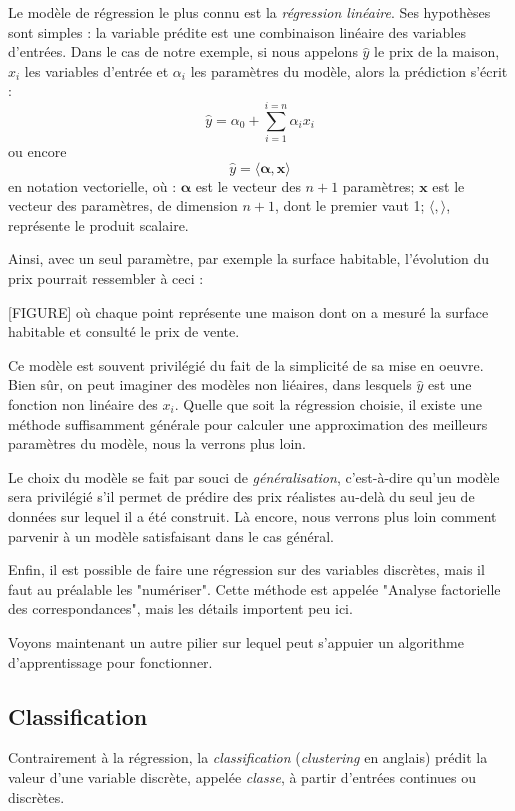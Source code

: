 Le modèle de régression le plus connu est la \emph{régression linéaire}. Ses hypothèses sont simples : la variable prédite est une combinaison linéaire des variables d'entrées. Dans le cas de notre exemple, si nous appelons \(\hat y\) le prix de la maison, \(x_i\) les variables d'entrée et \(\alpha_i\) les paramètres du modèle, alors la prédiction s'écrit :
\[\hat{y} = \alpha_0 + \sum_{i = 1}^{i = n}{\alpha_i x_i}\]
ou encore 
\begin{equation} \label{eq:reg_lin}
\hat{y} = \langle \boldsymbol{\alpha}, \boldsymbol{x} \rangle
\end{equation}
en notation vectorielle, où : \(\boldsymbol{\alpha}\) est le vecteur des \(n + 1\) paramètres; \(\boldsymbol{x}\) est le vecteur des paramètres, de dimension \(n + 1\), dont le premier vaut 1;  \(\langle, \rangle\), représente le produit scalaire.

Ainsi, avec un seul paramètre, par exemple la surface habitable, l'évolution du prix pourrait ressembler à ceci :

[FIGURE]
où chaque point représente une maison dont on a mesuré la surface habitable et consulté le prix de vente.

Ce modèle est souvent privilégié du fait de la simplicité de sa mise en oeuvre. Bien sûr, on peut imaginer des modèles non liéaires, dans lesquels \(\hat y\) est une fonction non linéaire des \(x_i\). Quelle que soit la régression choisie, il existe une méthode suffisamment générale pour calculer une approximation des meilleurs paramètres du modèle, nous la verrons plus loin.

Le choix du modèle se fait par souci de \emph{généralisation}, c'est-à-dire qu'un modèle sera privilégié s'il permet de prédire des prix réalistes au-delà du seul jeu de données sur lequel il a été construit. Là encore, nous verrons plus loin comment parvenir à un modèle satisfaisant dans le cas général. 

Enfin, il est possible de faire une régression sur des variables discrètes, mais il faut au préalable les "numériser". Cette méthode est appelée "Analyse factorielle des correspondances", mais les détails importent peu ici.

Voyons maintenant un autre pilier sur lequel peut s'appuier un algorithme d'apprentissage pour fonctionner.

\subsection{Classification} 
Contrairement à la régression, la \emph{classification} (\emph{clustering} en anglais) prédit la valeur d'une variable discrète, appelée \emph{classe}, à partir d'entrées continues ou discrètes.

